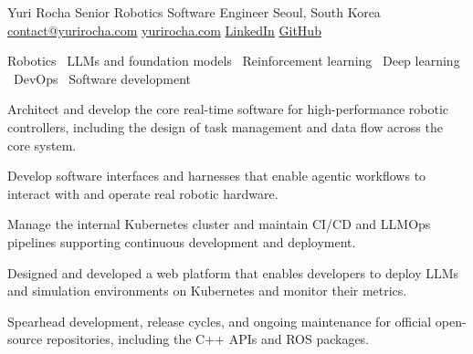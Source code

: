 \documentclass[10pt,a4paper]{article}
\begin{document}
\cvheader
  {Yuri Rocha}
  {Senior Robotics Software Engineer}
  {Seoul, South Korea}
  {\href{mailto:contact@yurirocha.com}{contact@yurirocha.com}\enspace\textbullet\enspace
   \href{https://www.yurirocha.com}{yurirocha.com}\enspace\textbullet\enspace
   \href{https://www.linkedin.com/in/yurirocha15/}{LinkedIn}\enspace\textbullet\enspace
   \href{https://github.com/yurirocha15}{GitHub}}

{\small Robotics \textbullet\ LLMs and foundation models \textbullet\ Reinforcement learning \textbullet\ Deep learning \textbullet\ DevOps \textbullet\ Software development\par}


\begin{cvbullets}
  \item Architect and develop the core real-time software for high-performance robotic controllers, including the design of task management and data flow across the core system.
  \item Develop software interfaces and harnesses that enable agentic workflows to interact with and operate real robotic hardware.
  \item Manage the internal Kubernetes cluster and maintain CI/CD and LLMOps pipelines supporting continuous development and deployment.
  \item Designed and developed a web platform that enables developers to deploy LLMs and simulation environments on Kubernetes and monitor their metrics.
  \item Spearhead development, release cycles, and ongoing maintenance for official open-source repositories, including the C++ APIs and ROS packages.
\end{cvbullets}
\end{document}

